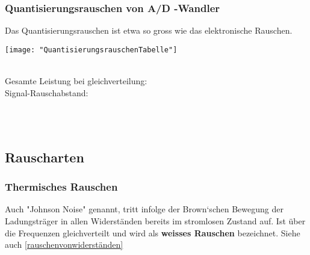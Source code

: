 \subsubsection{Quantisierungsrauschen von A/D -Wandler}
Das Quantisierungsrauschen ist etwa so gross wie das elektronische Rauschen.\\
\begin{minipage}[t]{0.4\textwidth}
	\vspace{0pt}
	\texttt{[image: "QuantisierungsrauschenTabelle"]}
\end{minipage}\hspace{0.05\textwidth}
\begin{minipage}[t]{0.2\textwidth}
	\vspace{0pt}
	\\
	Gesamte Leistung bei gleichverteilung:
	\\
	Signal-Rauschabstand:
	\\
\end{minipage}\hspace{0.05\textwidth}
\begin{minipage}[t]{0.3\textwidth}
	\\
	\\
\end{minipage}
\vspace{2mm}


\subsection{Rauscharten}


\subsubsection{Thermisches Rauschen} \label{thermischesrauschen}
Auch "Johnson Noise" genannt, tritt infolge der Brown‘schen Bewegung der Ladungsträger in allen Widerständen bereits im stromlosen Zustand auf.
Ist über die Frequenzen gleichverteilt und wird als \textbf{weisses Rauschen} bezeichnet. Siehe auch \ref{rauschenvonwiderständen}

